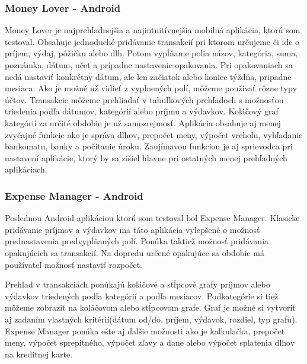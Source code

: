 \documentclass[12pt,onesided]{book}
\begin{document}
\subsubsection{Money Lover - Android \cite{MoneyLover}\ }

Money Lover je najprehľadnejšia a najintuitívnejšia mobilná aplikácia, ktorú som testoval. Obsahuje jednoduché pridávanie transakcií pri ktorom určujeme či ide o príjem, výdaj, pôžičku alebo dlh. Potom vypĺňame polia názov, kategória, suma, poznámka, dátum, učet a prípadne nastavenie opakovania. Pri opakovaniach sa nedá nastaviť konkrétny dátum, ale len začiatok alebo koniec týždňa, pripadne mesiaca. Ako je možné už vidieť z vyplnených polí, môžeme používať rôzne typy účtov. Transakcie môžeme prehliadať v tabuľkových prehľadoch s možnosťou triedenia podľa dátumov, kategórií alebo príjmu a výdavkov. Koláčový graf kategórií za určité obdobie je už samozrejmosť. Aplikácia obsahuje aj menej zvyčajné funkcie ako je správa dlhov, prepočet meny, výpočet vrcholu, vyhľadanie bankomatu, banky a počítanie úroku. Zaujímavou funkciou je aj sprievodca pri nastavení aplikácie, ktorý by sa zišiel hlavne pri ostatných menej prehľadných aplikáciach. 

\subsubsection{Expense Manager - Android \cite{ExpenseManager}\ }

Poslednou Android aplikáciou ktorú som testoval bol Expense Manager. Klasicke pridávanie príjmov a výdavkov ma táto aplikácia vylepšené o možnosť prednastavenia predvypĺňaných polí. Ponúka taktiež možnosť pridávania opakujúcich sa transakcií. Na dopredu určené opakujúce sa obdobie má používateľ možnosť nastaviť rozpočet. 

Prehľad v transakciách ponúkajú koláčové a stĺpcové grafy príjmov alebo výdavkov triedených podľa kategórií a podľa mesiacov. Podkategórie si tiež môžeme zobraziť na koláčovom alebo stĺpcovom grafe. Graf je možné si vytvoriť aj zadaním vlastných kritérií(dátum od/do, príjem, výdavok, rozdiel, typ grafu).
Expense Manager ponúka ešte aj ďalšie možnosti ako je kalkulačka, prepočet meny, výpočet sprepitného, výpočet zľavy a dane alebo výpočet splatenia dlhov na kreditnej karte.
\end{document}
